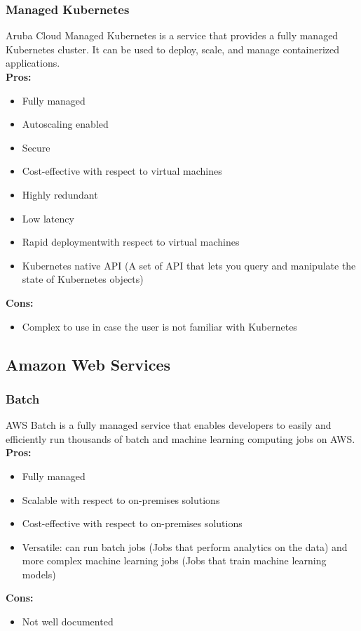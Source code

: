     \subsubsection{Managed Kubernetes}
    \label{aruba-cloud:kubernetes}
 Aruba Cloud Managed Kubernetes is a service that provides a fully managed Kubernetes cluster. It can be used to deploy, scale, and manage containerized applications.\\
    \textbf{Pros:}
    \begin{itemize}
        \item Fully managed
        \item Autoscaling enabled
        \item Secure
        \item Cost-effective with respect to virtual machines
        \item Highly redundant
        \item Low latency 
        \item Rapid deploymentwith respect to virtual machines
        \item Kubernetes native API (A set of API that lets you query and manipulate the state of Kubernetes objects)
    \end{itemize}
    \textbf{Cons:}
    \begin{itemize}
        \item Complex to use in case the user is not familiar with Kubernetes
    \end{itemize}


    \subsection{Amazon Web Services}

        \subsubsection{Batch}
        \label{aws:batch}
 AWS Batch is a fully managed service that enables developers to easily and efficiently run thousands of batch and machine learning computing jobs on AWS.\\
        \textbf{Pros:}
        \begin{itemize}
            \item Fully managed
            \item Scalable with respect to on-premises solutions
            \item Cost-effective with respect to on-premises solutions
            \item Versatile: can run batch jobs (Jobs that perform analytics on the data) and more complex machine learning jobs (Jobs that train machine learning models)
        \end{itemize}
        \textbf{Cons:}
        \begin{itemize}
            \item Not well documented
        \end{itemize}

